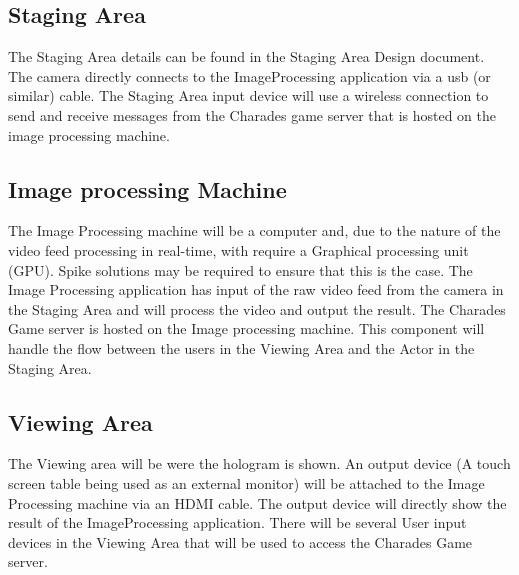 \documentclass{article}
\begin{document}
\subsection{Staging Area}
The Staging Area details can be found in the Staging Area Design document. The camera directly connects to the ImageProcessing application via a usb (or similar) cable. The Staging Area input device will use a wireless connection to send and receive messages from the Charades game server that is hosted on the image processing machine.
 
\subsection{Image processing Machine}
The Image Processing machine will be a computer and, due to the nature of the video feed processing in real-time, with require a Graphical processing unit (GPU). Spike solutions may be required to ensure that this is the case. The Image Processing application has input of the raw video feed from the camera in the Staging Area and will process the video and output the result.
The Charades Game server is hosted on the Image processing machine. This component will handle the flow between the users in the Viewing Area and the Actor in the Staging Area.

\subsection{Viewing Area}
The Viewing area will be were the hologram is shown. An output device (A touch screen table being used as an external monitor) will be attached to the Image Processing machine via an HDMI cable. The output device will directly show the result of the ImageProcessing application.
There will be several User input devices in the Viewing Area that will be used to access the Charades Game server.
\end{document}
